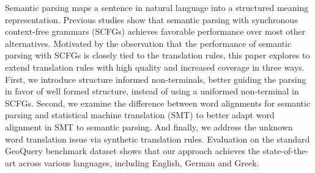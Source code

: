 Semantic parsing maps a sentence in natural language into a structured meaning representation. Previous studies show that semantic parsing with synchronous context-free grammars (SCFGs) achieves favorable performance over most other alternatives. Motivated by the observation that the performance of semantic parsing with SCFGs is closely tied to the translation rules, this paper explores to extend translation rules with high quality and increased coverage in three ways. First, we introduce structure informed non-terminals, better guiding the parsing in favor of well formed structure, instead of using a uniformed non-terminal in SCFGs. Second, we examine the difference between word alignments for semantic parsing and statistical machine translation (SMT) to better adapt word alignment in SMT to semantic parsing. And finally, we address the unknown word translation issue via synthetic translation rules. Evaluation on the standard GeoQuery benchmark dataset shows that our approach achieves the state-of-the-art across various languages, including English, German and Greek.
